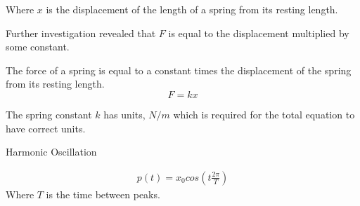 \documentclass{report}
\begin{document}
\begin{description}
\begin{mdframed}
            Where $x$ is the displacement of the length of a spring
            from its resting length.

            Further investigation revealed that $F$ is equal to
            the displacement multiplied by some constant.

            \vspace{10pt}



            The force of a spring is equal to a constant times the 
            displacement of the spring from its resting length.
            \begin{displaymath}
                F = kx
            \end{displaymath}
            
            The spring constant $k$ has units,  $N/m$ which is required
            for the total equation to have correct units.
        \end{mdframed}
    \item Harmonic Oscillation
        \begin{mdframed}
            \begin{gather}
                p(t) = x_0 cos(t \frac{2\pi}{T})
            \end{gather}
            Where $T$ is the time between peaks.


        \end{mdframed}

\end{description}
\end{document}
